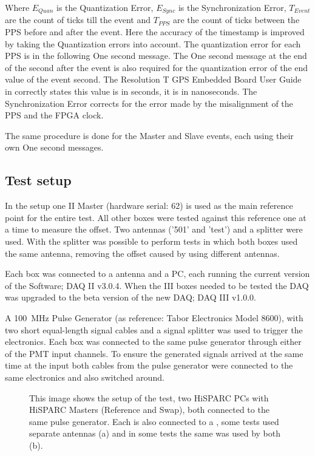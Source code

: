 Where $E_{Quan}$ is the Quantization Error, $E_{Sync}$ is the Synchronization Error, $T_{Event}$ are the count of ticks till the event and $T_{PPS}$ are the count of ticks between the PPS before and after the event. Here the accuracy of the timestamp is improved by taking the Quantization errors into account. The quantization error for each PPS is in the following One second message. The One second message at the end of the second after the event is also required for the quantization error of the end value of the event second. The Resolution T GPS Embedded Board User Guide in correctly states this value is in seconds, it is in nanoseconds. The Synchronization Error corrects for the error made by the misalignment of the PPS and the FPGA clock.

The same procedure is done for the Master and Slave events, each using their own One second messages.


\subsection{Test setup}
\label{sub:gps_test_setup}

In the setup one \hisparc II Master (hardware serial: 62) is used as the main reference point for the entire test. All other \hisparc boxes were tested against this reference one at a time to measure the offset. Two \gps antennas ('501' and 'test') and a \gps splitter were used. With the splitter was possible to perform tests in which both \hisparc boxes used the same \gps antenna, removing the offset caused by using different \gps antennas.

Each \hisparc box was connected to a \gps antenna and a PC, each running the current version of the \hisparc Software; \hisparc DAQ II v3.0.4. When the \hisparc III boxes needed to be tested the DAQ was upgraded to the beta version of the new DAQ; \hisparc DAQ III v1.0.0.

A \SI{100}{\mega\hertz} Pulse Generator (as reference: Tabor Electronics Model 8600), with two short equal-length signal cables and a signal splitter was used to trigger the \hisparc electronics. Each box was connected to the same pulse generator through either of the PMT input channels. To ensure the generated signals arrived at the same time at the input both cables from the pulse generator were connected to the same \hisparc electronics and also switched around.

\begin{figure}
    \centering
    
    \caption{This image shows the setup of the test, two HiSPARC PCs
             with HiSPARC Masters (Reference and Swap), both connected
             to the same pulse generator. Each is also connected to a
             \gps, some tests used separate \gps antennas (a) and in
             some tests the same \gps was used by both (b).}
    \label{fig:setup}
\end{figure}



